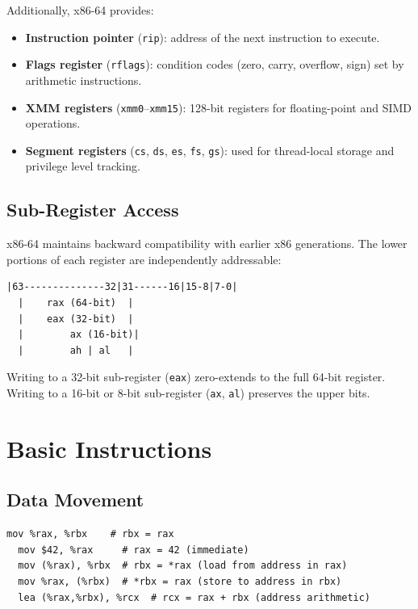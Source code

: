 Additionally, x86-64 provides:

\begin{itemize}
	\item \textbf{Instruction pointer} (\texttt{rip}): address of the next instruction to execute.
	\item \textbf{Flags register} (\texttt{rflags}): condition codes (zero, carry, overflow, sign) set by arithmetic instructions.
	\item \textbf{XMM registers} (\texttt{xmm0}--\texttt{xmm15}): 128-bit registers for floating-point and SIMD operations.
	\item \textbf{Segment registers} (\texttt{cs}, \texttt{ds}, \texttt{es}, \texttt{fs}, \texttt{gs}): used for thread-local storage and privilege level tracking.
\end{itemize}

\subsection{Sub-Register Access}

x86-64 maintains backward compatibility with earlier x86 generations. The lower portions of each register are independently addressable:

\begin{lstlisting}[caption=rax and its sub-registers]
  |63--------------32|31------16|15-8|7-0|
  |    rax (64-bit)  |
  |    eax (32-bit)  |
  |        ax (16-bit)|
  |        ah | al   |
\end{lstlisting}

Writing to a 32-bit sub-register (\texttt{eax}) zero-extends to the full 64-bit register. Writing to a 16-bit or 8-bit sub-register (\texttt{ax}, \texttt{al}) preserves the upper bits.

\section{Basic Instructions}

\subsection{Data Movement}

\begin{lstlisting}[caption=Data movement instructions (AT\&T syntax)]
  mov %rax, %rbx    # rbx = rax
  mov $42, %rax     # rax = 42 (immediate)
  mov (%rax), %rbx  # rbx = *rax (load from address in rax)
  mov %rax, (%rbx)  # *rbx = rax (store to address in rbx)
  lea (%rax,%rbx), %rcx  # rcx = rax + rbx (address arithmetic)
\end{lstlisting}

